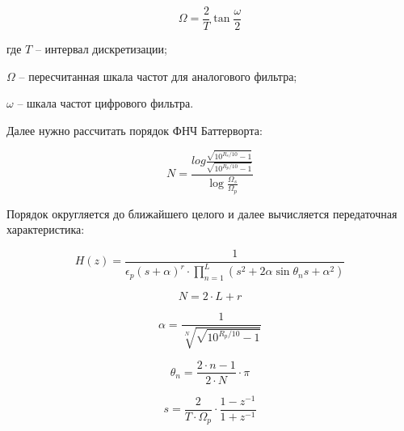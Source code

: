 \begin{equation}
    \label{eq:domain:Omega}
    \Omega=\frac{2}{T}\tan{\frac{\omega}{2}}
    \end{equation}
    \begin{explanationx}
        \item[где] $T$  -- интервал дискретизации;
        \item      $\Omega$  -- пересчитанная шкала частот для аналогового фильтра;
        \item      $\omega$  -- шкала частот цифрового фильтра.
      \end{explanationx} 

Далее нужно рассчитать порядок ФНЧ Баттерворта:

\begin{equation}
    \label{eq:domain:NIIC}
    N=\frac{log{\frac{\sqrt{10^{R_{s}/10}-1}}
                     {\sqrt{10^{R_{p}/10}-1}}}}
           {\log{\frac{\Omega_{s}}
                      {\Omega_{p}}}}
    \end{equation}


Порядок округляется до ближайшего целого и далее вычисляется передаточная характеристика:

\begin{equation}
    \label{eq:domain:Hz}
    H(z) = \frac{1}
                {\epsilon_{p} (s + \alpha )^r \cdot \prod_{n=1}^{L} (s^{2} + 2 \alpha \sin{ \theta_{n} s + \alpha^{2}})}
    \end{equation}

\begin{equation}
        \label{eq:domain:whereN}
        N=2 \cdot L+r
        \end{equation}

\begin{equation}
        \label{eq:domain:whereAlpha}
        \alpha=\frac{1}
                    {\sqrt[N]{\sqrt{10^{R_{p}/10}-1}}}
        \end{equation}

\begin{equation}
        \label{eq:domain:whereTheta}
        \theta_{n}=\frac{2\cdot n - 1}
                        {2\cdot N} \cdot \pi
        \end{equation}

\begin{equation}
        \label{eq:domain:whereS}
        s=\frac{2}
                {T\cdot \Omega_{p}} \cdot \frac{1-z^{-1}}
                                                {1+z^{-1}}
        \end{equation}

